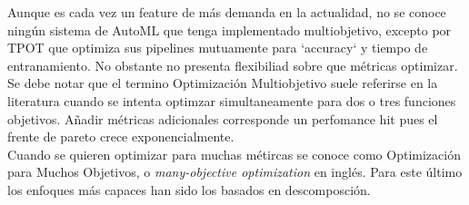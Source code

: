 Aunque es cada vez un feature de m\'as demanda en la actualidad, no se conoce ning\'un sistema de AutoML que tenga implementado multiobjetivo, excepto por TPOT que optimiza sus pipelines mutuamente para `accuracy` y tiempo de entranamiento. No obstante no presenta flexibiliad sobre que m\'etricas optimizar.\\


Se debe notar que el termino Optimizaci\'on Multiobjetivo suele referirse en la literatura cuando se intenta optimzar simultaneamente para dos o tres funciones objetivos. Añadir m\'etricas adicionales corresponde un perfomance hit pues el frente de pareto crece exponencialmente.\\

Cuando se quieren optimizar para muchas m\'etircas se conoce como Optimizaci\'on para Muchos Objetivos, o \textit{many-objective optimization} en ingl\'es. Para este \'ultimo los enfoques m\'as capaces han sido los basados en descomposci\'on. 
